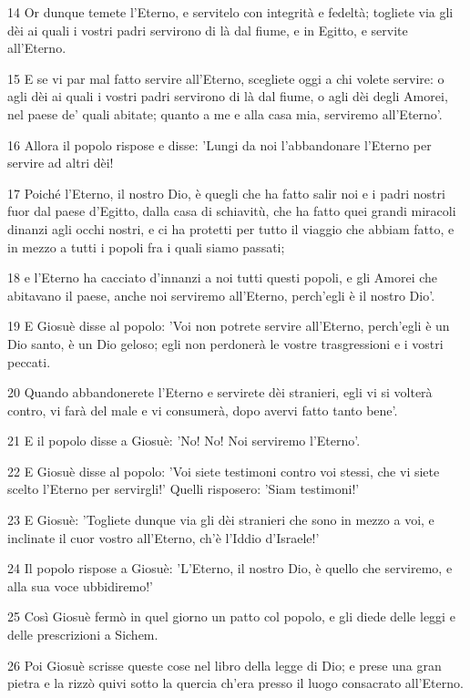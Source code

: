 \par 14 Or dunque temete l'Eterno, e servitelo con integrità e fedeltà; togliete via gli dèi ai quali i vostri padri servirono di là dal fiume, e in Egitto, e servite all'Eterno.
\par 15 E se vi par mal fatto servire all'Eterno, scegliete oggi a chi volete servire: o agli dèi ai quali i vostri padri servirono di là dal fiume, o agli dèi degli Amorei, nel paese de' quali abitate; quanto a me e alla casa mia, serviremo all'Eterno'.
\par 16 Allora il popolo rispose e disse: 'Lungi da noi l'abbandonare l'Eterno per servire ad altri dèi!
\par 17 Poiché l'Eterno, il nostro Dio, è quegli che ha fatto salir noi e i padri nostri fuor dal paese d'Egitto, dalla casa di schiavitù, che ha fatto quei grandi miracoli dinanzi agli occhi nostri, e ci ha protetti per tutto il viaggio che abbiam fatto, e in mezzo a tutti i popoli fra i quali siamo passati;
\par 18 e l'Eterno ha cacciato d'innanzi a noi tutti questi popoli, e gli Amorei che abitavano il paese, anche noi serviremo all'Eterno, perch'egli è il nostro Dio'.
\par 19 E Giosuè disse al popolo: 'Voi non potrete servire all'Eterno, perch'egli è un Dio santo, è un Dio geloso; egli non perdonerà le vostre trasgressioni e i vostri peccati.
\par 20 Quando abbandonerete l'Eterno e servirete dèi stranieri, egli vi si volterà contro, vi farà del male e vi consumerà, dopo avervi fatto tanto bene'.
\par 21 E il popolo disse a Giosuè: 'No! No! Noi serviremo l'Eterno'.
\par 22 E Giosuè disse al popolo: 'Voi siete testimoni contro voi stessi, che vi siete scelto l'Eterno per servirgli!' Quelli risposero: 'Siam testimoni!'
\par 23 E Giosuè: 'Togliete dunque via gli dèi stranieri che sono in mezzo a voi, e inclinate il cuor vostro all'Eterno, ch'è l'Iddio d'Israele!'
\par 24 Il popolo rispose a Giosuè: 'L'Eterno, il nostro Dio, è quello che serviremo, e alla sua voce ubbidiremo!'
\par 25 Così Giosuè fermò in quel giorno un patto col popolo, e gli diede delle leggi e delle prescrizioni a Sichem.
\par 26 Poi Giosuè scrisse queste cose nel libro della legge di Dio; e prese una gran pietra e la rizzò quivi sotto la quercia ch'era presso il luogo consacrato all'Eterno.
